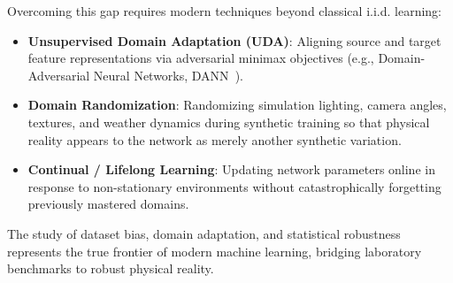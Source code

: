 Overcoming this gap requires modern techniques beyond classical i.i.d. learning:
\begin{itemize}[noitemsep]
  \item \textbf{Unsupervised Domain Adaptation (UDA)}: Aligning source and target feature representations via adversarial minimax objectives (e.g., Domain-Adversarial Neural Networks, DANN~\cite{ganin2016domain}).
  \item \textbf{Domain Randomization}: Randomizing simulation lighting, camera angles, textures, and weather dynamics during synthetic training so that physical reality appears to the network as merely another synthetic variation.
  \item \textbf{Continual / Lifelong Learning}: Updating network parameters online in response to non-stationary environments without catastrophically forgetting previously mastered domains.
\end{itemize}
The study of dataset bias, domain adaptation, and statistical robustness represents the true frontier of modern machine learning, bridging laboratory benchmarks to robust physical reality.

